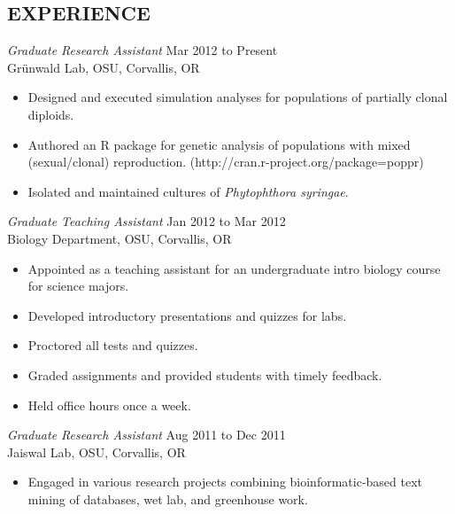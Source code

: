 \documentclass[margin, 10pt]{res} %
\begin{document}
\begin{resume}
 
\section{EXPERIENCE}

{\sl Graduate Research Assistant} \hfill Mar 2012 to Present \\
Gr\"unwald Lab, OSU, Corvallis, OR

\begin{itemize} \itemsep -2pt %
\item Designed and executed simulation analyses for populations of partially clonal diploids. 
\item Authored an R package for genetic analysis of populations with mixed \\(sexual/clonal) reproduction. (http://cran.r-project.org/package=poppr)
\item Isolated and maintained cultures of \textit{Phytophthora syringae}.
\end{itemize}
 
{\sl Graduate Teaching Assistant} \hfill Jan 2012 to Mar 2012 \\
Biology Department, OSU, Corvallis, OR 
\begin{itemize} \itemsep -2pt %
\item Appointed as a teaching assistant for an undergraduate intro biology course for science majors.
\item Developed introductory presentations and quizzes for labs.
\item Proctored all tests and quizzes.
\item Graded assignments and provided students with timely feedback.
\item Held office hours once a week.
\end{itemize} 

{\sl Graduate Research Assistant} \hfill Aug 2011 to Dec 2011 \\
Jaiswal Lab, OSU, Corvallis, OR
\begin{itemize} \itemsep -2pt %
\item Engaged in various research projects combining bioinformatic-based text mining of databases, wet lab, and greenhouse work.
\end{itemize} 


\end{resume}
\end{document}
